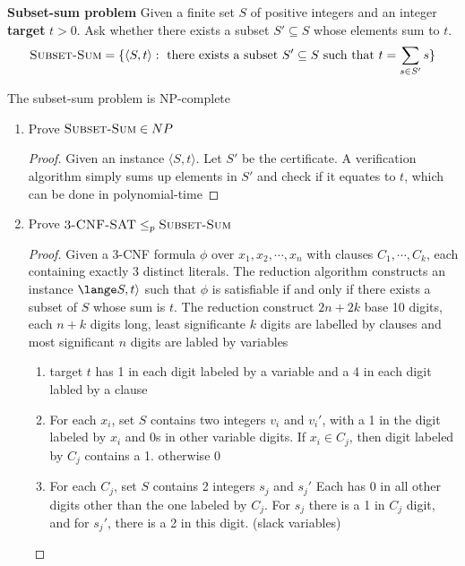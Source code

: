\documentclass[11pt]{article}
\begin{document}
\begin{defn*}
    \textbf{Subset-sum problem} Given a finite set $S$ of positive integers and an integer \textbf{target} $t>0$. Ask whether there exists a subset $S' \subseteq S$ whose elements sum to $t$. 
    \[
        \textsc{Subset-Sum} = \{\langle S, t \rangle: \text{ there exists a subset $S' \subseteq S$ such that } t = \sum_{s\in S'} s \}
    \]
\end{defn*}




\begin{theorem*}
    The subset-sum problem is NP-complete
    \begin{enumerate}
        \item Prove $\textsc{Subset-Sum}\in NP$
        \begin{proof}
            Given an instance $\langle S, t\rangle$. Let $S'$ be the certificate. A verification algorithm simply sums up elements in $S'$ and check if it equates to $t$, which can be done in polynomial-time
        \end{proof}
        \item Prove $\textsc{3-CNF-SAT}\leq_p \textsc{Subset-Sum}$
        \begin{proof}
            Given a 3-CNF formula $\phi$ over $x_1, x_2, \cdots, x_n$ with clauses $C_1, \cdots, C_k$, each containing exactly 3 distinct literals. The reduction algorithm constructs an instance $\lange S, t \rangle$ such that $\phi$ is satisfiable if and only if there exists a subset of $S$ whose sum is $t$. The reduction construct $2n + 2k$ base 10 digits, each $n+k$ digits long, least significante $k$ digits are labelled by clauses and most significant $n$ digits are labled by variables 
            \begin{enumerate}
                \item target $t$ has 1 in each digit labeled by a variable and a 4 in each digit labled by a clause 
                \item For each $x_i$, set $S$ contains two integers $v_i$ and $v_i'$, with a 1 in the digit labeled by $x_i$ and 0s in other variable digits. If $x_i\in C_j$, then digit labeled by $C_j$ contains a 1. otherwise 0
                \item For each $C_j$, set $S$ contains 2 integers $s_j$ and $s_j'$ Each has 0 in all other digits other than the one labeled by $C_j$. For $s_j$ there is a 1 in $C_j$ digit, and for $s_j'$, there is a 2 in this digit. (slack variables)
            \end{enumerate}

\end{proof}
\end{enumerate}
\end{theorem*}
\end{document}
